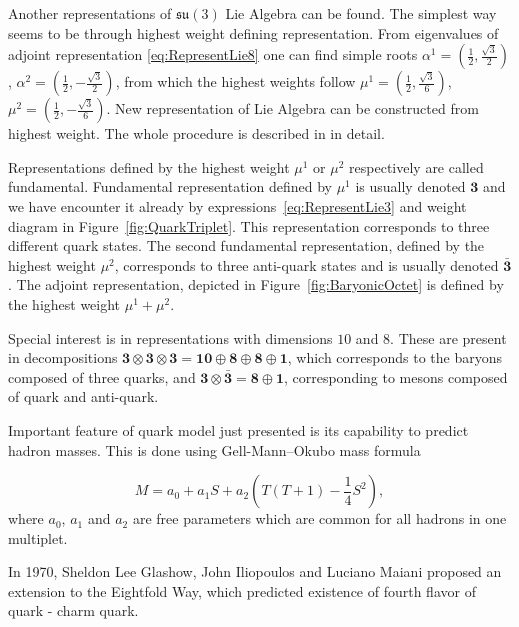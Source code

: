 Another representations of $\mathfrak{su}(3)$ Lie Algebra can be found.
The simplest way seems to be through highest weight defining representation.
From eigenvalues of adjoint representation \eqref{eq:RepresentLie8} one can find
simple roots 
$\alpha^1=\left( \frac{1}{2}, \frac{\sqrt{3}}{2} \right)$, 
$\alpha^2=\left( \frac{1}{2}, - \frac{\sqrt{3}}{2} \right)$, 
from which the highest weights follow
$\mu^1=\left( \frac{1}{2}, \frac{\sqrt{3}}{6} \right)$, 
$\mu^2=\left( \frac{1}{2}, - \frac{\sqrt{3}}{6} \right)$. 
New representation of Lie Algebra can be constructed from highest weight.
The whole procedure is described in \cite{LieAlgebrasForParticlePhysicists} in
detail.

Representations defined by the highest weight $\mu^1$ or $\mu^2$ respectively are
called fundamental. Fundamental representation defined by $\mu^1$ is usually
denoted $\mathbf{3}$ and we have encounter it already by
expressions~\eqref{eq:RepresentLie3} and weight diagram in
Figure~\ref{fig:QuarkTriplet}. This representation corresponds to three
different quark states.  
The second fundamental representation, defined by the highest weight $\mu^2$,
corresponds to three anti-quark states and is usually denoted
$\bar{\mathbf{3}}$. 
The adjoint representation, depicted in Figure~\ref{fig:BaryonicOctet} is
defined by the highest weight $\mu^1 + \mu^2$.

Special interest is in representations with dimensions $10$ and $8$. These
are present in decompositions $\mathbf{3} \otimes \mathbf{3} \otimes
\mathbf{3} = \mathbf{10} \oplus \mathbf{8} \oplus \mathbf{8} \oplus \mathbf{1}$,
which corresponds to the baryons composed of three quarks, and $\mathbf{3}
\otimes \bar{\mathbf{3}} = \mathbf{8} \oplus \mathbf{1}$, corresponding to
mesons composed of quark and anti-quark.

Important feature of quark model just presented is its capability to predict
hadron masses. This is done using Gell-Mann--Okubo mass formula
\cite{Gell-Mann:1250016,Okubo01051962}

\begin{equation}
  M = a_0 + a_1 S + a_2 \left( T(T+1) - \frac{1}{4}S^2 \right),
  \label{eq:GellMannOkubo}
\end{equation}
where $a_0$, $a_1$ and $a_2$ are free parameters which are common for all
hadrons in one multiplet. 

In 1970, Sheldon Lee Glashow, John Iliopoulos and Luciano Maiani proposed
\cite{Quarks4} an extension to the Eightfold Way, which predicted existence of
fourth flavor of quark - charm quark.

